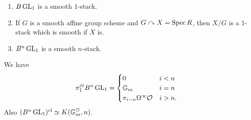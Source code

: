 \documentclass{amsart}
\begin{document}
\begin{ex}
	\begin{enumerate}
		\item $B\operatorname{GL}_1$ is a smooth $1$-stack.
		\item If $G$ is a smooth affine group scheme and $G \curvearrowright X = \operatorname{Spec} R$, then $X / G$ is a $1$-stack which is smooth if $X$ is.
		\item $B^n \operatorname{GL}_1$ is a smooth $n$-stack.
	\end{enumerate}
\end{ex}

\begin{rmk}
	We have
	\[
		\pi_1^{\acute{e}t} B^n \operatorname{GL}_1 = \begin{cases}
			0 & i < n \\
			\mathbb{G}_m & i = n \\
			\pi_{i-n} \Omega^\infty \mathcal{O} & i > n.
		\end{cases}
	\]
	Also $(B^n \operatorname{GL}_1)^{\mathrm{cl}} \simeq K(\mathbb{G}_m^\heartsuit, n)$.
\end{rmk}
\end{document}
